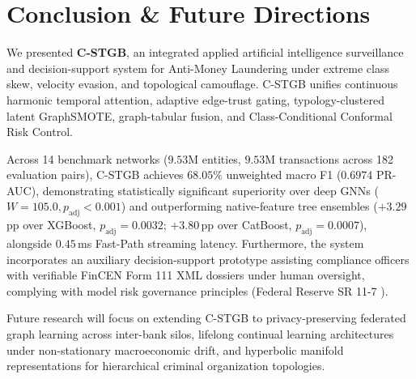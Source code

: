 \section{Conclusion \& Future Directions}
\label{sec:conclusion}
We presented \textbf{C-STGB}, an integrated applied artificial intelligence surveillance and decision-support system for Anti-Money Laundering under extreme class skew, velocity evasion, and topological camouflage. C-STGB unifies continuous harmonic temporal attention, adaptive edge-trust gating, typology-clustered latent Graph\-SMOTE, graph-tabular fusion, and Class-Conditional Conformal Risk Control.

Across 14 benchmark networks ($9.53\text{M}$ entities, $9.53\text{M}$ transactions across 182 evaluation pairs), C-STGB achieves $68.05\%$ unweighted macro F1 ($0.6974$ PR-AUC), demonstrating statistically significant superiority over deep GNNs ($W=105.0, p_{\text{adj}} < 0.001$) and outperforming native-feature tree ensembles ($+3.29$\,pp over XGBoost, $p_{\text{adj}} = 0.0032$; $+3.80$\,pp over CatBoost, $p_{\text{adj}} = 0.0007$), alongside $0.45$\,ms Fast-Path streaming latency. Furthermore, the system incorporates an auxiliary decision-support prototype assisting compliance officers with verifiable FinCEN Form 111 XML dossiers under human oversight, complying with model risk governance principles (Federal Reserve SR 11-7 \citep{fed2011sr117}).

Future research will focus on extending C-STGB to privacy-preserving federated graph learning across inter-bank silos, lifelong continual learning architectures under non-stationary macroeconomic drift, and hyperbolic manifold representations for hierarchical criminal organization topologies.
